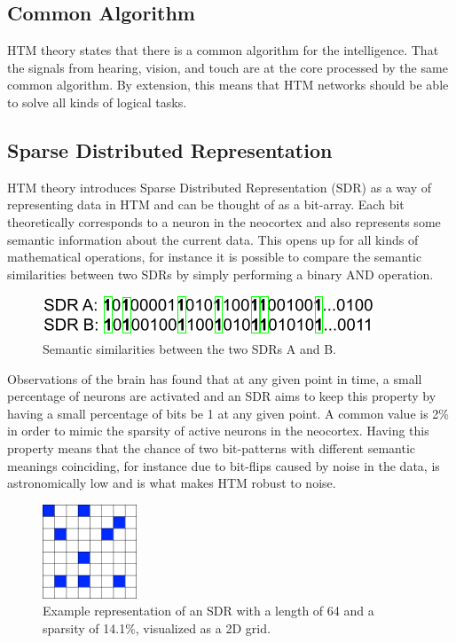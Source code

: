 \subsection{Common Algorithm}
HTM theory states that there is a common algorithm for the intelligence. That the signals from hearing, vision, and touch are at the core processed by the same common algorithm. By extension, this means that HTM networks should be able to solve all kinds of logical tasks.
\subsection{Sparse Distributed Representation}
HTM theory introduces Sparse Distributed Representation (SDR) as a way of representing data in HTM and can be thought of as a bit-array. Each bit theoretically corresponds to a neuron in the neocortex and also represents some semantic information about the current data. This opens up for all kinds of mathematical operations, for instance it is possible to compare the semantic similarities between two SDRs by simply performing a binary AND operation.
\begin{figure}[H]
    \centering
    \includegraphics{resources/related_works/sdr-semantics.png}
    \caption{Semantic similarities between the two SDRs A and B.}
    \label{fig:sdr_semantics}
\end{figure}
Observations of the brain has found that at any given point in time, a small percentage of neurons are activated and an SDR aims to keep this property by having a small percentage of bits be 1 at any given point. A common value is 2\% in order to mimic the sparsity of active neurons in the neocortex. Having this property means that the chance of two bit-patterns with different semantic meanings coinciding, for instance due to bit-flips caused by noise in the data, is astronomically low and is what makes HTM robust to noise.
\begin{figure}[H]
    \centering
    \includegraphics[width=0.25\textwidth]{resources/related_works/SDR.png}
    \caption{Example representation of an SDR with a length of 64 and a sparsity of 14.1\%, visualized as a 2D grid.}
\end{figure}
